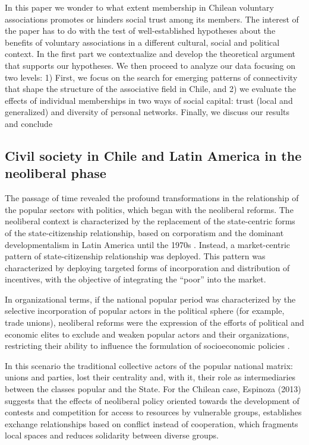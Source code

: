 In this paper we wonder to what extent membership in Chilean voluntary associations promotes or hinders social trust among its members. The interest of the paper has to do with the test of well-established hypotheses about the benefits of voluntary associations in a different cultural, social and political context. In the first part we contextualize and develop the theoretical argument that supports our hypotheses. We then proceed to analyze our data focusing on two levels: 1) First, we focus on the search for emerging patterns of connectivity that shape the structure of the associative field in Chile, and 2) we evaluate the effects of individual memberships in two ways of social capital: trust (local and generalized) and diversity of personal networks. Finally, we discuss our results and conclude


\subsection{Civil society in Chile and Latin America in the neoliberal phase}

The passage of time revealed the profound transformations in the relationship of the popular sectors with politics, which began with the neoliberal reforms. The neoliberal context is characterized by the replacement of the state-centric forms of the state-citizenship relationship, based on corporatism and the dominant developmentalism in Latin America until the 1970s \parencite{oxhorn_neopluralism_2004}. Instead, a market-centric pattern of state-citizenship relationship was deployed. This pattern was characterized by deploying targeted forms of incorporation and distribution of incentives, with the objective of integrating the “poor” into the market. 
\bigskip

In organizational terms, if the national popular period was characterized by the selective incorporation of popular actors in the political sphere (for example, trade unions), neoliberal reforms were the expression of the efforts of political and economic elites to exclude and weaken popular actors and their organizations, restricting their ability to influence the formulation of socioeconomic policies \parencite{collier_shaping_1991, cook_politics_2009, espinoza_local_2013, rossi_second_2015, silva_reshaping_2018}. 
\bigskip

In this scenario the traditional collective actors of the popular national matrix: unions and parties, lost their centrality \parencite{barozet_entre_2016,espinoza_local_2013,garreton_cambios_2001} and, with it, their role as intermediaries between the classes popular and the State. For the Chilean case, Espinoza (2013) suggests that the effects of neoliberal policy oriented towards the development of contests and competition for access to resources by vulnerable groups, establishes exchange relationships based on conflict instead of cooperation, which fragments local spaces and reduces solidarity between diverse groups. 
\bigskip

